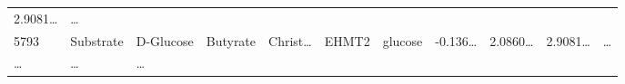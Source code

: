 \documentclass[
]{article}
\begin{document}
\begin{longtable}[]{@{}lllllllllll@{}}
\begin{minipage}[t]{0.07\columnwidth}
2.9081\ldots{}\strut
\end{minipage} & \begin{minipage}[t]{0.03\columnwidth}\raggedright
\ldots{}\strut
\end{minipage}\tabularnewline
\begin{minipage}[t]{0.05\columnwidth}\raggedright
5793\strut
\end{minipage} & \begin{minipage}[t]{0.07\columnwidth}\raggedright
Substrate\strut
\end{minipage} & \begin{minipage}[t]{0.07\columnwidth}\raggedright
D-Glucose\strut
\end{minipage} & \begin{minipage}[t]{0.09\columnwidth}\raggedright
Butyrate\strut
\end{minipage} & \begin{minipage}[t]{0.07\columnwidth}\raggedright
Christ\ldots{}\strut
\end{minipage} & \begin{minipage}[t]{0.07\columnwidth}\raggedright
EHMT2\strut
\end{minipage} & \begin{minipage}[t]{0.09\columnwidth}\raggedright
glucose\strut
\end{minipage} & \begin{minipage}[t]{0.07\columnwidth}\raggedright
-0.136\ldots{}\strut
\end{minipage} & \begin{minipage}[t]{0.07\columnwidth}\raggedright
2.0860\ldots{}\strut
\end{minipage} & \begin{minipage}[t]{0.07\columnwidth}\raggedright
2.9081\ldots{}\strut
\end{minipage} & \begin{minipage}[t]{0.03\columnwidth}\raggedright
\ldots{}\strut
\end{minipage}\tabularnewline
\begin{minipage}[t]{0.05\columnwidth}\raggedright
\ldots{}\strut
\end{minipage} & \begin{minipage}[t]{0.07\columnwidth}\raggedright
\ldots{}\strut
\end{minipage} & \begin{minipage}[t]{0.07\columnwidth}\raggedright
\ldots{}\strut
\end{minipage} & \begin{minipage}[t]{0.09\columnwidth}\raggedright

\end{minipage}
\end{longtable}
\end{document}
